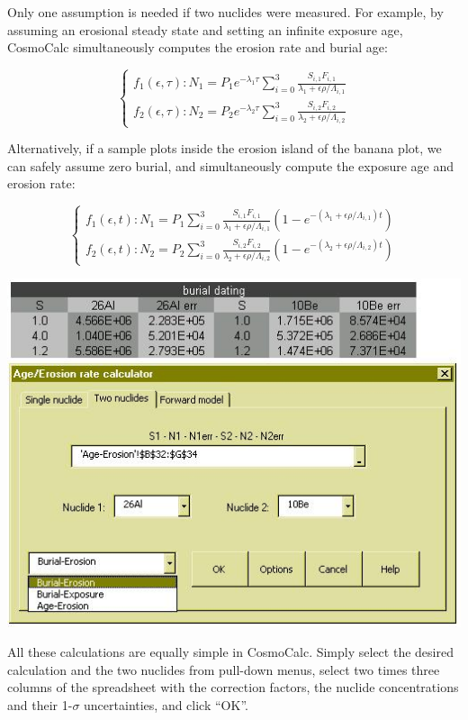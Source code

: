 \documentclass[12pt]{article}
\begin{document}
Only  one assumption  is needed  if  two nuclides  were measured.  For
example, by assuming an erosional steady state and setting an infinite
exposure age,  CosmoCalc simultaneously computes the  erosion rate and
burial age:

$$
\left\{
\begin{array}{l}
f_1(\epsilon,\tau): N_1 = P_1 e^{- \lambda_1 \tau} \sum_{i=0}^3 
   \frac{S_{i,1} F_{i,1}}{\lambda_1 + \epsilon \rho / \Lambda_{i,1}}\\
f_2(\epsilon,\tau): N_2 = P_2 e^{- \lambda_2 \tau} \sum_{i=0}^3 
   \frac{S_{i,2} F_{i,2}}{\lambda_2 + \epsilon \rho / \Lambda_{i,2}}
\end{array}\right.
$$

Alternatively,  if a  sample plots  inside the  erosion island  of the
banana  plot, we  can safely  assume zero  burial,  and simultaneously
compute the exposure age and erosion rate:

$$
\left\{
\begin{array}{l}
f_1(\epsilon,t):  N_1 = P_1 \sum_{i=0}^3\frac{S_{i,1} F_{i,1}}{\lambda_1 + \epsilon \rho / \Lambda_{i,1}} 
    \left( 1 - e^{- \left( \lambda_1 + \epsilon \rho / \Lambda_{i,1} \right) t} \right)\\
f_2(\epsilon,t):  N_2 = P_2 \sum_{i=0}^3\frac{S_{i,2} F_{i,2}}{\lambda_2 + \epsilon \rho / \Lambda_{i,2}} 
    \left( 1 - e^{- \left( \lambda_2 + \epsilon \rho / \Lambda_{i,2} \right) t} \right)
\end{array}\right.
$$

\begin{minipage}[tbp]{\textwidth}
  \begin{center}
  \includegraphics[width=.6\textwidth]{twoNuclideAge.jpg}\\
  \end{center}
  All  these calculations  are  equally simple  in CosmoCalc.   Simply
  select the  desired calculation and the two  nuclides from pull-down
  menus, select  two times three  columns of the spreadsheet  with the
  correction factors, the  nuclide concentrations and their 1-$\sigma$
  uncertainties, and click ``OK''.
  \\
\end{minipage}
\end{document}
